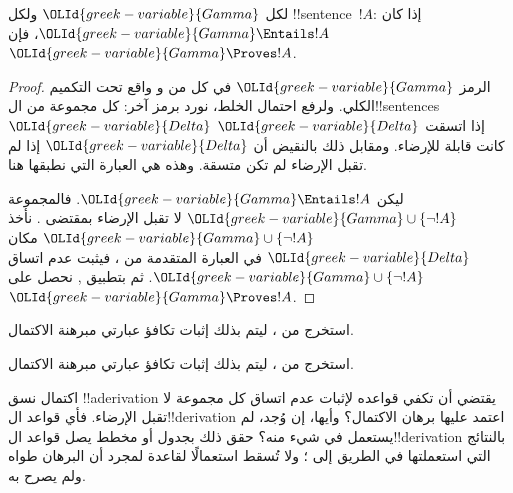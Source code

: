 \documentclass[../../../include/open-logic-section]{subfiles}
\begin{document}
\begin{cor}
لكل ${\OLId{greek-variable}{Gamma}}$ ولكل !!{sentence}~$!A$: إذا كان ${\OLId{greek-variable}{Gamma}} \Entails !A$،
فإن ${\OLId{greek-variable}{Gamma}} \Proves !A$.
\end{cor}

\begin{proof}
الرمز ${\OLId{greek-variable}{Gamma}}$ في كل من  و
 واقع تحت التكميم الكلي. ولرفع احتمال الخلط،
نورد  برمز آخر: كل مجموعة من
ال!!{sentence}s~${\OLId{greek-variable}{Delta}}$ إذا اتسقت ${\OLId{greek-variable}{Delta}}$ كانت قابلة للإرضاء.
ومقابل ذلك بالنقيض أن ${\OLId{greek-variable}{Delta}}$ إذا لم تقبل الإرضاء لم تكن متسقة.
وهذه هي العبارة التي نطبقها هنا.

ليكن ${\OLId{greek-variable}{Gamma}} \Entails !A$. فالمجموعة ${\OLId{greek-variable}{Gamma}} \cup \{\lnot !A\}$
لا تقبل الإرضاء بمقتضى . نأخذ
${\OLId{greek-variable}{Gamma}} \cup \{\lnot !A\}$ مكان ${\OLId{greek-variable}{Delta}}$ في العبارة المتقدمة من
، فيثبت عدم اتساق ${\OLId{greek-variable}{Gamma}} \cup \{\lnot !A\}$.
ثم بتطبيق
,
نحصل على ${\OLId{greek-variable}{Gamma}} \Proves !A$.
\end{proof}

\begin{prob}
استخرج من 
، ليتم بذلك إثبات تكافؤ
عبارتي مبرهنة الاكتمال.
\end{prob}
\tagendprob

\begin{prob}
استخرج من 
، ليتم بذلك إثبات تكافؤ
عبارتي مبرهنة الاكتمال.
\end{prob}
\tagendprob

\begin{prob}
اكتمال نسق !!a{derivation} يقتضي أن تكفي قواعده لإثبات عدم اتساق
كل مجموعة لا تقبل الإرضاء. فأي قواعد ال!!{derivation} اعتمد عليها
برهان الاكتمال؟ وأيها، إن وُجد، لم يستعمل في شيء منه؟ حقق ذلك بجدول
أو مخطط يصل قواعد ال!!{derivation} بالنتائج التي استعملتها في الطريق
إلى ؛ ولا تُسقط استعمالًا
لقاعدة لمجرد أن البرهان طواه ولم يصرح به.
\end{prob}
\tagendprob
\end{document}
